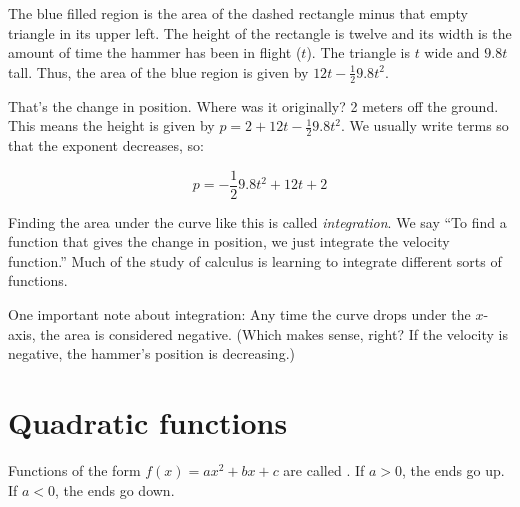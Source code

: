 The blue filled region is the area of the dashed rectangle minus that
empty triangle in its upper left.  The height of the rectangle is
twelve and its width is the amount of time the hammer has been in
flight ($t$). The triangle is $t$ wide and $9.8t$ tall. Thus, the
area of the blue region is given by $12t - \frac{1}{2}9.8 t^2$.

That's the change in position. Where was it originally? 2 meters off
the ground. This means the height is given by $p = 2 + 12t - \frac{1}{2}9.8t^2$.
We usually write terms so that the exponent decreases, so:

$$p = - \frac{1}{2}9.8t^2 + 12t + 2$$

Finding the area under the curve like this is called
\textit{integration}. We say ``To find a function that gives the
change in position, we just integrate the velocity function.''  Much
of the study of calculus is learning to integrate different sorts of
functions.

One important note about integration: Any time the curve drops under
the $x$-axis, the area is considered negative. (Which makes sense,
right? If the velocity is negative, the hammer's position is
decreasing.)




\section{Quadratic functions}

Functions of the form $f(x) = a x^2 + b x + c$ are called 
. 
If $a > 0$, the ends go up.
If $a < 0$, the ends go down.



